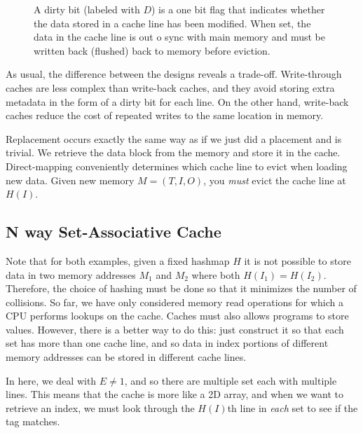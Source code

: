 \begin{definition}
\begin{enumerate}
\begin{figure}[H]
        \caption{A dirty bit (labeled with $D$) is a one bit flag that indicates whether the data stored in a cache line has been modified. When set, the data in the cache line is out o sync with main memory and must be written back (flushed) back to memory before eviction. } 
        \label{fig:dirty_bit}
      \end{figure}
    \end{enumerate}
    As usual, the difference between the designs reveals a trade-off. Write-through caches are less complex than write-back caches, and they avoid storing extra metadata in the form of a dirty bit for each line. On the other hand, write-back caches reduce the cost of repeated writes to the same location in memory.
  \end{definition}

  \begin{theorem}[Replacement]
    Replacement occurs exactly the same way as if we just did a placement and is trivial. We retrieve the data block from the memory and store it in the cache. Direct-mapping conveniently determines which cache line to evict when loading new data. Given new memory $M = (T, I, O)$, you \textit{must} evict the cache line at $H(I)$. 
  \end{theorem}

\subsection{N way Set-Associative Cache}

  Note that for both examples, given a fixed hashmap $H$ it is not possible to store data in two memory addresses $M_1$ and $M_2$ where both $H(I_1) = H(I_2)$. Therefore, the choice of hashing must be done so that it minimizes the number of collisions. So far, we have only considered memory read operations for which a CPU performs lookups on the cache. Caches must also allows programs to store values. However, there is a better way to do this: just construct it so that each set has more than one cache line, and so data in index portions of different memory addresses can be stored in different cache lines.

  In here, we deal with $E \neq 1$, and so there are multiple set each with multiple lines. This means that the cache is more like a 2D array, and when we want to retrieve an index, we must look through the $H(I)$th line in \textit{each} set to see if the tag matches. 

